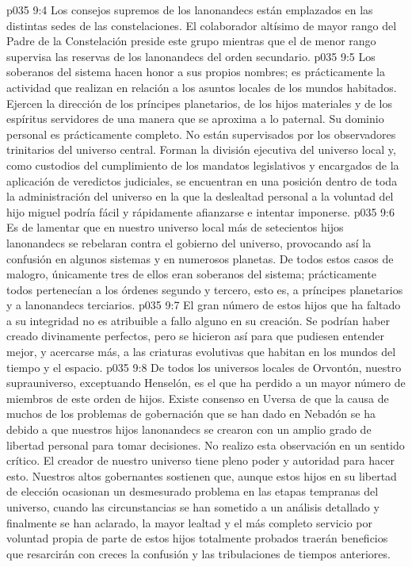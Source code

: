 \vs p035 9:4 Los consejos supremos de los lanonandecs están emplazados en las distintas sedes de las constelaciones. El colaborador altísimo de mayor rango del Padre de la Constelación preside este grupo mientras que el de menor rango supervisa las reservas de los lanonandecs del orden secundario.
\vs p035 9:5 \pc Los soberanos del sistema hacen honor a sus propios nombres; es prácticamente la actividad que realizan en relación a los asuntos locales de los mundos habitados. Ejercen la dirección de los príncipes planetarios, de los hijos materiales y de los espíritus servidores de una manera que se aproxima a lo paternal. Su dominio personal es prácticamente completo. No están supervisados por los observadores trinitarios del universo central. Forman la división ejecutiva del universo local y, como custodios del cumplimiento de los mandatos legislativos y encargados de la aplicación de veredictos judiciales, se encuentran en una posición dentro de toda la administración del universo en la que la deslealtad personal a la voluntad del hijo miguel podría fácil y rápidamente afianzarse e intentar imponerse.
\vs p035 9:6 Es de lamentar que en nuestro universo local más de setecientos hijos lanonandecs se rebelaran contra el gobierno del universo, provocando así la confusión en algunos sistemas y en numerosos planetas. De todos estos casos de malogro, únicamente tres de ellos eran soberanos del sistema; prácticamente todos pertenecían a los órdenes segundo y tercero, esto es, a príncipes planetarios y a lanonandecs terciarios.
\vs p035 9:7 El gran número de estos hijos que ha faltado a su integridad no es atribuible a fallo alguno en su creación. Se podrían haber creado divinamente perfectos, pero se hicieron así para que pudiesen entender mejor, y acercarse más, a las criaturas evolutivas que habitan en los mundos del tiempo y el espacio.
\vs p035 9:8 De todos los universos locales de Orvontón, nuestro suprauniverso, exceptuando Henselón, es el que ha perdido a un mayor número de miembros de este orden de hijos. Existe consenso en Uversa de que la causa de muchos de los problemas de gobernación que se han dado en Nebadón se ha debido a que nuestros hijos lanonandecs se crearon con un amplio grado de libertad personal para tomar decisiones. No realizo esta observación en un sentido crítico. El creador de nuestro universo tiene pleno poder y autoridad para hacer esto. Nuestros altos gobernantes sostienen que, aunque estos hijos en su libertad de elección ocasionan un desmesurado problema en las etapas tempranas del universo, cuando las circunstancias se han sometido a un análisis detallado y finalmente se han aclarado, la mayor lealtad y el más completo servicio por voluntad propia de parte de estos hijos totalmente probados traerán beneficios que resarcirán con creces la confusión y las tribulaciones de tiempos anteriores.
